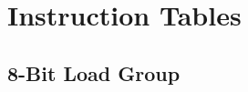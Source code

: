\documentclass[oneside,a4paper]{book}
\begin{document}
\chapter{Instruction Tables}


\newcommand{\instrheader}{
	\hline
		
		& 
		Symbolic &
		\multicolumn{8}{c}{Flags} & 
		\multicolumn{3}{c}{Opcode} &
		& & 
		M & 
		T & \\

		Mnemonic & 
		Operation &
		SF & ZF & YF & HF & XF & PF & NF & CF &
		76 & 543 & 210 & 
		Hex & Bytes & 
		Cycles & States & 
		Comments \\

	\hline
}


\startcontents[intrstructionsections]


\section{8-Bit Load Group}
\end{document}
